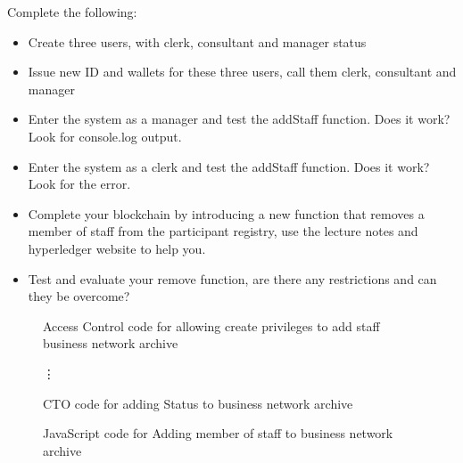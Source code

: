 Complete the following:
\begin{itemize}
	\item Create three users, with clerk, consultant and manager status
	\item Issue new ID and wallets for these three users, call them clerk, consultant and manager
	\item Enter the system as a manager and test the addStaff function. Does it work? Look for console.log output.
	\item Enter the system as a clerk and test the addStaff function. Does it work? Look for the error.
	\item Complete your blockchain by introducing a new function that removes a member of staff from the participant registry, use the lecture notes and hyperledger website to help you.
	\item Test and evaluate your remove function, are there any restrictions and can they be overcome?
\end{itemize}

\begin{figure}
	
	\caption{Access Control code for allowing create privileges to add staff business network archive}
	\label{fi:t5:acl}
\end{figure}


\begin{figure}
	
	\vdots
	
	\caption{CTO code for adding Status to business network archive}
	\label{fi:t5:cto}
\end{figure}

\begin{figure}
	
	\caption{JavaScript code for Adding member of staff to business network archive}
	\label{fi:t5:js}
\end{figure}


